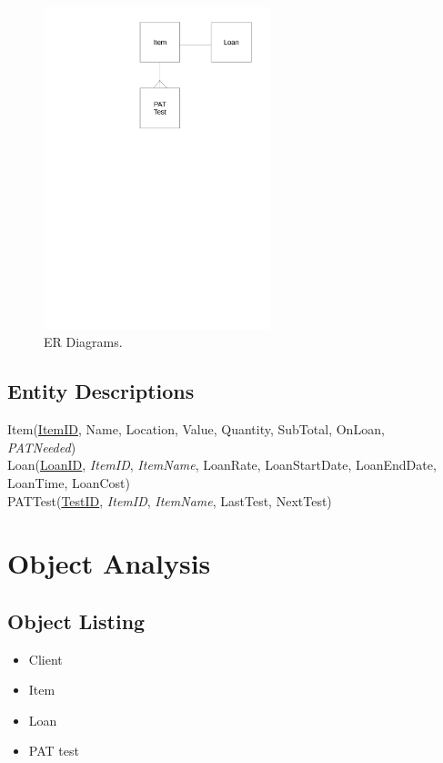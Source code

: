 \begin{figure}[H]
    \centerline{\includegraphics[width=250px]{./Analysis/ER_Diagrams/ER_Diagrams.pdf}}
    \caption{ER Diagrams.} \label{fig:ER Diagrams}
\end{figure}

\newpage

\subsection{Entity Descriptions}

Item(\underline{ItemID}, Name, Location, Value, Quantity, SubTotal, OnLoan,\\
\noindent \emph{PATNeeded})\\

\noindent Loan(\underline{LoanID}, \emph{ItemID}, \emph{ItemName}, LoanRate, LoanStartDate, LoanEndDate, LoanTime, LoanCost)\\

\noindent PATTest(\underline{TestID}, \emph{ItemID}, \emph{ItemName}, LastTest, NextTest)

\section{Object Analysis}

\subsection{Object Listing}

\begin{itemize}
    \item Client
    \item Item
    \item Loan
    \item PAT test
\end{itemize}

